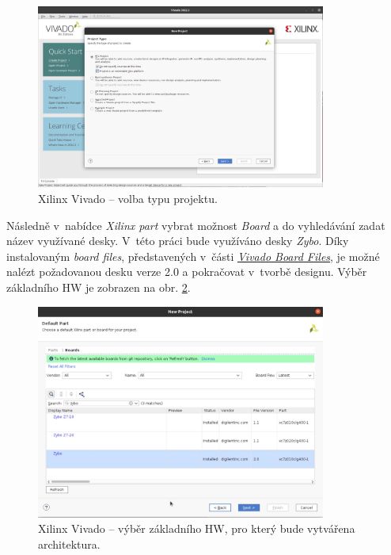 \documentclass[a4paper, twoside, 11pt]{article}
\begin{document}
\begin{appendices}
			\begin{figure}[htbp!]
				\centering
				\includegraphics[width=0.85\textwidth]{src/png/zybo-xilinx-vivado-flow/zybo-xilinx-vivado-flow-01.jpg}
				\caption{Xilinx Vivado – volba typu projektu.}
				\label{fig:zybo-xilinx-vivado-flow-01}
			\end{figure}

		Následně v~nabídce \textit{Xilinx part} vybrat možnost \textit{Board} a do vyhledávání zadat název využívané desky. V~této práci bude využíváno desky \textit{Zybo}. Díky instalovaným \textit{board files}, představených v~části \hyperref[subsec:vivado-board-files]{\textit{Vivado Board Files}}, je možné nalézt požadovanou desku verze 2.0 a pokračovat v~tvorbě designu. Výběr základního HW je zobrazen na obr. \ref{fig:zybo-xilinx-vivado-flow-02}.

		\begin{figure}[htbp!]
			\centering
			\includegraphics[width=0.85\textwidth]{src/png/zybo-xilinx-vivado-flow/zybo-xilinx-vivado-flow-02.jpg}
			\caption{Xilinx Vivado – výběr základního HW, pro který bude vytvářena architektura.}
			\label{fig:zybo-xilinx-vivado-flow-02}
		\end{figure}
		

\end{appendices}
\end{document}
